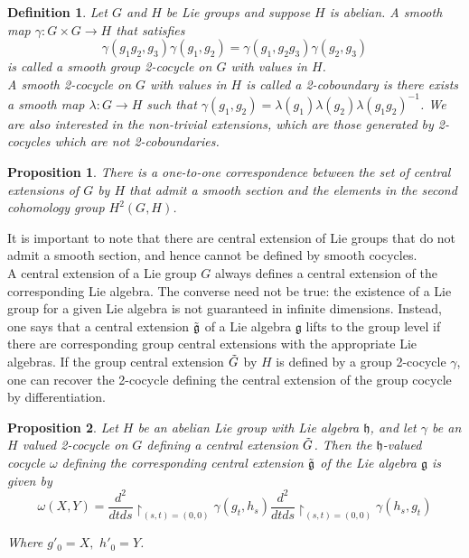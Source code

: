 \documentclass{article}
\newtheorem{defn}{Definition}
\newtheorem{prop}{Proposition}
\begin{document}
\begin{defn}

Let $G$ and $H$ be Lie groups and suppose $H$ is abelian. A smooth map $ \gamma: G \times G \to H$ that satisfies
\[
	\gamma (g_1 g_2, g_3) \gamma (g_1, g_2) = \gamma (g_1, g_2 g_3) \gamma (g_2, g_3)
\]
is called a smooth \textit{group 2-cocycle} on $G$ with values in $H$.\\
\indent A smooth 2-cocycle on $G$ with values in $H$ is called a \textit{2-coboundary} is there exists a smooth map $ \lambda: G \to H$ such that $\gamma (g_1, g_2) = \lambda(g_1) \lambda(g_2) \lambda (g_1 g_2)^{-1}$. We are also interested in the non-trivial extensions, which are those generated by 2-cocycles which are not 2-coboundaries.
\end{defn}


\begin{prop}

	There is a one-to-one correspondence between the set of central extensions of $G$ by $H$ that admit a smooth section and the elements in the second cohomology group $H^2(G,H)$.

\end{prop}

It is important to note that there are central extension of Lie groups that do not admit a smooth section, and hence cannot be defined by smooth cocycles.\\
\indent A central extension of a Lie group $G$ always defines a central extension of the corresponding Lie algebra. The converse need not be true: the existence of a Lie group for a given Lie algebra is not guaranteed in infinite dimensions. Instead, one says that a central extension $ \Tilde{ \mathfrak{g} }$ of a Lie algebra $ \mathfrak{g}$ lifts to the group level if there are corresponding group central extensions with the appropriate Lie algebras. If the group central extension $ \Tilde{ G }$ by $H$ is defined by a group 2-cocycle $\gamma$, one can recover the 2-cocycle defining the central extension of the group cocycle by differentiation.


\begin{prop}

Let $H$ be an abelian Lie group with Lie algebra $ \mathfrak{h}$, and let $\gamma$ be an $H$ valued 2-cocycle on $G$ defining a central extension $ \Tilde{ G }$. Then the $ \mathfrak{h}$-valued cocycle $\omega$ defining the corresponding central extension $ \Tilde{ \mathfrak{g} }$ of the Lie algebra $ \mathfrak{g}$ is given by 
\[
	\omega(X,Y) = \frac{d^2}{dtds}\restriction_{(s,t)=(0,0)} \gamma(g_t, h_s)  \frac{d^2}{dtds}\restriction_{(s,t)=(0,0)} \gamma (h_s, g_t)
\]

Where $g'_0 = X, \hspace{4pt} h'_0 = Y$.
\end{prop}
\end{document}
